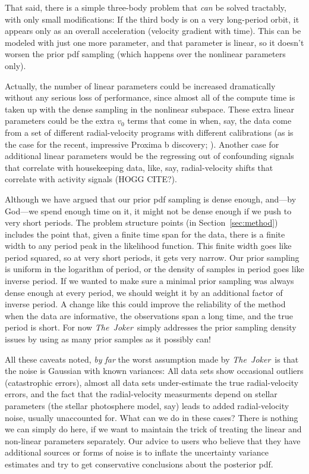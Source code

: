 \documentclass[manuscript, letterpaper]{aastex6}
\newcommand{\project}[1]{\textsl{#1}}
\newcommand{\samplername}{\project{The~Joker}}
\newcommand{\sectionname}{Section}
\begin{document}
That said, there is a simple three-body problem that \emph{can} be
solved tractably, with only small modifications:
If the third body is on a very long-period orbit, it appears only
as an overall acceleration (velocity gradient with time).
This can be modeled with just one more parameter, and that parameter
is linear, so it doesn't worsen the prior pdf sampling (which happens
over the nonlinear parameters only).

Actually, the number of linear parameters could be increased
dramatically without any serious loss of performance, since almost all
of the compute time is taken up with the dense sampling in the nonlinear
subspace.
These extra linear parameters could be the extra $v_0$ terms that come
in when, say, the data come from a set of different radial-velocity
programs with different calibrations (as is the case for the recent,
impressive Proxima b discovery; \citealt{proximab}).
Another case for additional linear parameters would be the regressing
out of confounding signals that correlate with housekeeping data,
like, say, radial-velocity shifts that correlate with activity signals
(HOGG CITE?).

Although we have argued that our prior pdf sampling is dense enough,
and---by God---we spend enough time on it, it might not be dense enough
if we push to very short periods.
The problem structure points (in \sectionname~\ref{sec:method})
includes the point that, given a finite time span for the data, there
is a finite width to any period peak in the likelihood function.
This finite width goes like period squared, so at very short periods,
it gets very narrow.
Our prior sampling is uniform in the logarithm of period, or the
density of samples in period goes like inverse period.
If we wanted to make sure a minimal prior sampling was always dense
enough at every period, we should weight it by an additional factor of
inverse period.
A change like this could improve the reliability of the method when the data
are informative, the observations span a long time, and the true
period is short.
For now \samplername\ simply addresses the prior sampling density issues
by using as many prior samples as it possibly can!

All these caveats noted, \emph{by far} the worst assumption made by
\samplername\ is that the noise is Gaussian with known variances:
All data sets show occasional outliers (catastrophic errors), almost
all data sets under-estimate the true radial-velocity errors, and the
fact that the radial-velocity measurments depend on stellar parameters
(the stellar photosphere model, say) leads to added radial-velocity
noise, usually unaccounted for.
What can we do in these cases?
There is nothing we can simply do here, if we want to maintain the
trick of treating the linear and non-linear parameters separately.
Our advice to users who believe that they have additional sources or
forms of noise is to inflate the uncertainty variance estimates and
try to get conservative conclusions about the posterior pdf.
\end{document}
